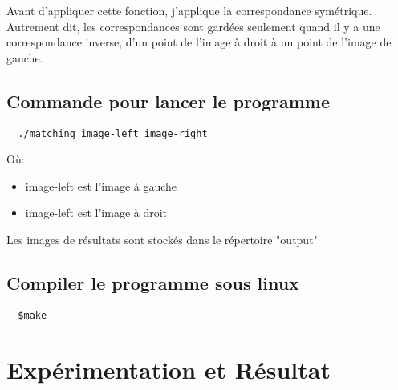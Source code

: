 \documentclass[french,12pt,a4paper,oneside,notitlepage]{report}
\begin{document}
Avant d'appliquer cette fonction, j'applique la correspondance symétrique. Autrement dit, 
les correspondances sont gardées seulement quand il y a une correspondance inverse, d'un 
point de l'image à droit à un point de l'image de gauche.
\subsection{Commande pour lancer le programme}
\begin{lstlisting}
  ./matching image-left image-right
\end{lstlisting}
Où:
\begin{itemize}
 \item image-left est l'image à gauche 
 \item image-left est l'image à droit
\end{itemize}
Les images de résultats sont stockés dans le répertoire "output"

\subsection{Compiler le programme sous linux}
\begin{lstlisting}
  $make 
\end{lstlisting}
\clearpage
\section{Expérimentation et Résultat}
\end{document}
